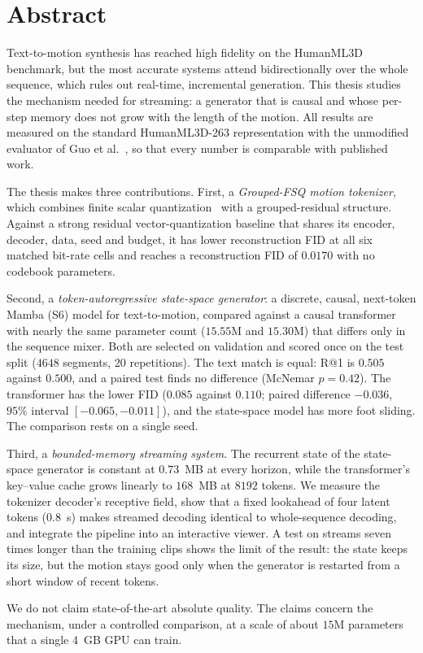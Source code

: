\chapter*{Abstract}

Text-to-motion synthesis has reached high fidelity on the HumanML3D benchmark, but the most accurate systems attend bidirectionally over the whole sequence, which rules out real-time, incremental generation. This thesis studies the mechanism needed for streaming: a generator that is causal and whose per-step memory does not grow with the length of the motion. All results are measured on the standard HumanML3D-263 representation with the unmodified evaluator of Guo et al.~\cite{guo2022humanml3d}, so that every number is comparable with published work.

The thesis makes three contributions. First, a \emph{Grouped-FSQ motion tokenizer}, which combines finite scalar quantization~\cite{mentzer2023fsq} with a grouped-residual structure. Against a strong residual vector-quantization baseline that shares its encoder, decoder, data, seed and budget, it has lower reconstruction FID at all six matched bit-rate cells and reaches a reconstruction FID of $0.0170$ with no codebook parameters.

Second, a \emph{token-autoregressive state-space generator}: a discrete, causal, next-token Mamba (S6) model for text-to-motion, compared against a causal transformer with nearly the same parameter count ($15.55$M and $15.30$M) that differs only in the sequence mixer. Both are selected on validation and scored once on the test split ($4648$ segments, 20 repetitions). The text match is equal: R@1 is $0.505$ against $0.500$, and a paired test finds no difference (McNemar $p = 0.42$). The transformer has the lower FID ($0.085$ against $0.110$; paired difference $-0.036$, $95\%$ interval $[-0.065, -0.011]$), and the state-space model has more foot sliding. The comparison rests on a single seed.

Third, a \emph{bounded-memory streaming system}. The recurrent state of the state-space generator is constant at $0.73$~MB at every horizon, while the transformer's key--value cache grows linearly to $168$~MB at $8192$ tokens. We measure the tokenizer decoder's receptive field, show that a fixed lookahead of four latent tokens ($0.8$~s) makes streamed decoding identical to whole-sequence decoding, and integrate the pipeline into an interactive viewer. A test on streams seven times longer than the training clips shows the limit of the result: the state keeps its size, but the motion stays good only when the generator is restarted from a short window of recent tokens.

We do not claim state-of-the-art absolute quality. The claims concern the mechanism, under a controlled comparison, at a scale of about $15$M parameters that a single 4~GB GPU can train.
